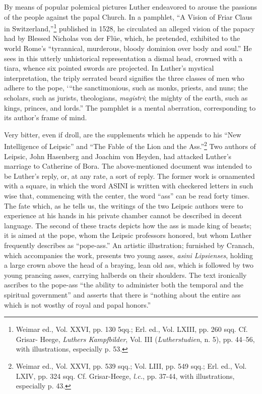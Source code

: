 By means of popular polemical pictures Luther endeavored to
arouse the passions of the people against the papal Church. In a pamphlet,
“A Vision of Friar Claus in Switzerland,”\footnote
{Weimar ed., Vol. XXVI, pp. 130 5qq.; Erl. ed., Vol. LXIII, pp. 260 sqq. Cf. Grisar-
Heege, \textit{Luthers Kampfbilder}, Vol. III (\textit{Lutherstudien}, n. 5), pp. 44--56, with illustrations,
especially p. 53.}
published in 1528,
he circulated an alleged vision of the papacy had by Blessed Nicholas
von der Flüe, which, he pretended, exhibited to the world Rome’s
“tyrannical, murderous, bloody dominion over body and soul.” He
sees in this utterly unhistorical representation a dismal head, crowned
with a tiara, whence six pointed swords are projected. In Luther’s
mystical interpretation, the triply serrated beard signifies the three
classes of men who adhere to the pope, ‘“the sanctimonious, such as
monks, priests, and nuns; the scholars, such as jurists, theologians,
\textit{magistri}; the mighty of the earth, such as kings, princes, and lords.”
The pamphlet is a mental aberration, corresponding to its author’s
frame of mind.

Very bitter, even if droll, are the supplements which he appends
to his “New Intelligence of Leipsic” and “The Fable of the Lion and
the Ass.”\footnote
{Weimar ed., Vol. XXVI, pp. 539 sqq.; Vol. LIII, pp. 549 sqq.; Erl. ed., Vol. LXIV, pp.
324 sqq. Cf. Grisar-Heege, \textit{l.c.}, pp. 37-44, with illustrations, especially p. 43.}
Two authors of Leipsic, John Hasenberg and Joachim
von Heyden, had attacked Luther’s marriage to Catherine of Bora.
The above-mentioned document was intended to be Luther’s reply,
or, at any rate, a sort of reply. The former work is ornamented with
a square, in which the word ASINI is written with checkered letters
in such wise that, commencing with the center, the word “ass” can
be read forty times. The fate which, as he tells us, the writings of the
two Leipsic authors were to experience at his hands in his private
chamber cannot be described in decent language. The second of these
tracts depicts how the ass is made king of beasts; it is aimed at the pope,
whom the Leipsic professors honored, but whom Luther frequently
describes as “pope-ass.” An artistic illustration; furnished by Cranach,
which accompanies the work, presents two young asses, \textit{asini Lipsienses},
holding a large crown above the head of a braying, lean old ass, which
is followed by two young prancing asses, carrying halberds on their
shoulders. The text ironically ascribes to the pope-ass “the ability to
administer both the temporal and the spiritual government” and asserts
that there is “nothing about the entire ass which is not wosthy
of royal and papal honors.”

